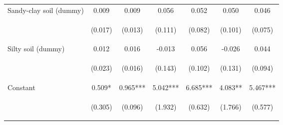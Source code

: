 \begin{center}
\begin{tabular}{lcccccc}
Sandy-clay soil (dummy) & 0.009 & 0.009 & 0.056 & 0.052 & 0.050 & 0.046 \\
\vspace{4pt} & \begin{footnotesize}(0.017)\end{footnotesize} & \begin{footnotesize}(0.013)\end{footnotesize} & \begin{footnotesize}(0.111)\end{footnotesize} & \begin{footnotesize}(0.082)\end{footnotesize} & \begin{footnotesize}(0.101)\end{footnotesize} & \begin{footnotesize}(0.075)\end{footnotesize} \\
Silty soil (dummy) & 0.012 & 0.016 & -0.013 & 0.056 & -0.026 & 0.044 \\
\vspace{4pt} & \begin{footnotesize}(0.023)\end{footnotesize} & \begin{footnotesize}(0.016)\end{footnotesize} & \begin{footnotesize}(0.143)\end{footnotesize} & \begin{footnotesize}(0.102)\end{footnotesize} & \begin{footnotesize}(0.131)\end{footnotesize} & \begin{footnotesize}(0.094)\end{footnotesize} \\
Constant & 0.509* & 0.965*** & 5.042*** & 6.685*** & 4.083** & 5.467*** \\
 & \begin{footnotesize}(0.305)\end{footnotesize} & \begin{footnotesize}(0.096)\end{footnotesize} & \begin{footnotesize}(1.932)\end{footnotesize} & \begin{footnotesize}(0.632)\end{footnotesize} & \begin{footnotesize}(1.766)\end{footnotesize} & \begin{footnotesize}(0.577)\end{footnotesize} \\

\end{tabular}
\end{center}
